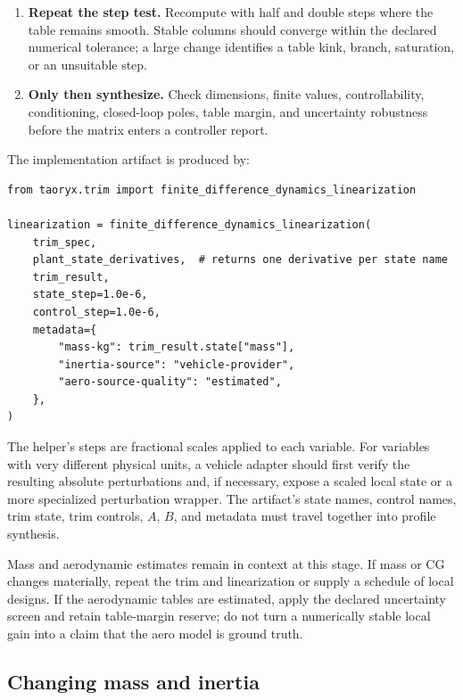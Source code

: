 \documentclass[11pt]{article}
\begin{document}
\begin{enumerate}
    $8.33\times10^{-4}$ and $2.38\times10^{-4}$ in SI units. Cross terms from
    $\boldsymbol\omega\times\boldsymbol v$ and
    $\boldsymbol\omega\times(I\boldsymbol\omega)$ are expected away from a
    zero-rate trim.
  \item \textbf{Repeat the step test.} Recompute with half and double steps
    where the table remains smooth. Stable columns should converge within the
    declared numerical tolerance; a large change identifies a table kink,
    branch, saturation, or an unsuitable step.
  \item \textbf{Only then synthesize.} Check dimensions, finite values,
    controllability, conditioning, closed-loop poles, table margin, and
    uncertainty robustness before the matrix enters a controller report.
\end{enumerate}

The implementation artifact is produced by:

\begin{lstlisting}
from taoryx.trim import finite_difference_dynamics_linearization

linearization = finite_difference_dynamics_linearization(
    trim_spec,
    plant_state_derivatives,  # returns one derivative per state name
    trim_result,
    state_step=1.0e-6,
    control_step=1.0e-6,
    metadata={
        "mass-kg": trim_result.state["mass"],
        "inertia-source": "vehicle-provider",
        "aero-source-quality": "estimated",
    },
)
\end{lstlisting}

The helper's steps are fractional scales applied to each variable. For
variables with very different physical units, a vehicle adapter should first
verify the resulting absolute perturbations and, if necessary, expose a
scaled local state or a more specialized perturbation wrapper. The artifact's
state names, control names, trim state, trim controls, $A$, $B$, and metadata
must travel together into profile synthesis.

Mass and aerodynamic estimates remain in context at this stage. If mass or CG
changes materially, repeat the trim and linearization or supply a schedule of
local designs. If the aerodynamic tables are estimated, apply the declared
uncertainty screen and retain table-margin reserve; do not turn a numerically
stable local gain into a claim that the aero model is ground truth.

\subsection{Changing mass and inertia}
\end{document}
